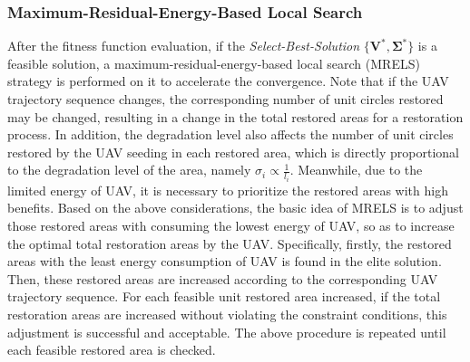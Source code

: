 \documentclass[preprint,5pt]{elsarticle}
\begin{document}
\subsubsection{Maximum-Residual-Energy-Based Local Search}
After the fitness function evaluation, if the \emph{Select-Best-Solution} $\{\mathbf{V}^*,\mathbf{\Sigma}^*\}$ is a feasible solution, a maximum-residual-energy-based local search (MRELS) strategy is performed on it to accelerate the convergence. Note that if the UAV trajectory sequence changes, the corresponding number of unit circles restored may be changed, resulting in a change in the total restored areas for a restoration process. In addition, the degradation level also affects the number of unit circles restored by the UAV seeding in each restored area, which is directly proportional to the degradation level of the area, namely $\sigma_i \varpropto \frac{1}{l_i}$. Meanwhile, due to the limited energy of UAV, it is necessary to prioritize the restored areas with high benefits. Based on the above considerations, the basic idea of MRELS is to adjust those restored areas with consuming the lowest energy of UAV, so as to increase the optimal total restoration areas by the UAV. Specifically, firstly, the restored areas with the least energy consumption of UAV is found in the elite solution. Then, these restored areas are increased according to the corresponding UAV trajectory sequence. For each feasible unit restored area increased, if the total restoration areas are increased without violating the constraint conditions, this adjustment is successful and acceptable. The above procedure is repeated until each feasible restored area is checked.
\end{document}
